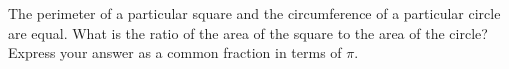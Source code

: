The perimeter of a particular square and the circumference of a particular circle are equal. What is the ratio of the area of the square to the area of the circle? Express your answer as a common fraction in terms of $\pi$.
